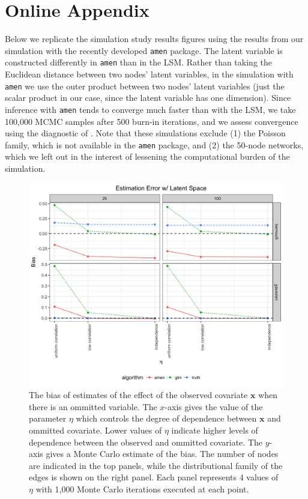 \documentclass[11pt]{article}
\begin{document}
\newpage




\newpage
\section*{Online Appendix}
Below we replicate the simulation study results figures using the results from our simulation with the recently developed \texttt{amen} package.  The latent variable is constructed differently in \texttt{amen} than in the LSM.  Rather than
taking the Euclidean distance between two nodes' latent variables, in the simulation with \texttt{amen} we use the outer product between two nodes' latent variables (just the scalar product in our case, since the latent variable has one dimension). Since inference with \texttt{amen} tends to converge much faster than with the LSM, we take 100,000 MCMC
samples after 500 burn-in iterations, and we assess convergence using
the diagnostic of \cite{raftery1992practical}. Note that these simulations exclude (1) the Poisson family, which is not available in the \texttt{amen} package, and (2) the 50-node networks, which we left out in the interest of lessening the computational burden of the simulation.

\begin{figure}
\includegraphics[width=\textwidth]{figures/estimation_ls_amen.png}
\caption{The bias of estimates of the effect of the observed covariate $\mathbf{x}$ when there is an ommitted variable. The $x$-axis gives the value of the parameter $\eta$ which controls the degree of dependence between $\mathbf{x}$ and ommitted covariate. Lower values of $\eta$ indicate higher levels of dependence between the observed and ommitted covariate. The $y$-axis gives a Monte Carlo estimate of the bias. The number of nodes are indicated in the top panels, while the distributional family of the edges is shown on the right panel. Each panel represents 4 values of $\eta$ with 1,000 Monte Carlo iterations executed at each point.
\label{fig:estimation_ls_amen}}
\end{figure}
\end{document}
